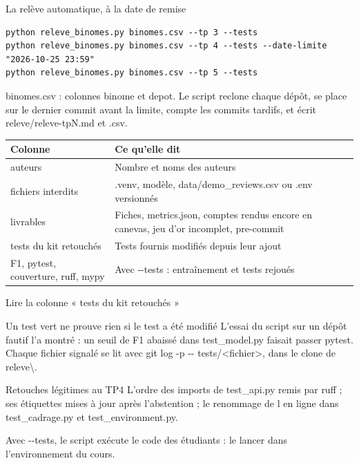 \documentclass[aspectratio=169,11pt]{beamer}
\newcommand{\co}[1]{{\ttfamily\hyphenchar\font=45\relax #1}}
\newcommand{\bs}{\textbackslash\allowbreak{}}
\begin{document}
\begin{frame}[fragile]{La relève automatique, à la date de remise}
\begin{lstlisting}
python releve_binomes.py binomes.csv --tp 3 --tests
python releve_binomes.py binomes.csv --tp 4 --tests --date-limite "2026-10-25 23:59"
python releve_binomes.py binomes.csv --tp 5 --tests
\end{lstlisting}
\small \co{binomes.csv} : colonnes \co{binome} et \co{depot}. Le script reclone chaque dépôt, se place sur le
dernier commit avant la limite, compte les commits tardifs, et écrit \co{releve/releve-tpN.md} et \co{.csv}.

\scriptsize
\begin{tabularx}{\textwidth}{@{}l X@{}}
\toprule
\textbf{Colonne} & \textbf{Ce qu'elle dit} \\
\midrule
\co{auteurs} & Nombre et noms des auteurs \\
\co{fichiers interdits} & \co{.venv}, modèle, \co{data/demo\_reviews.csv} ou \co{.env} versionnés \\
\co{livrables} & Fiches, \co{metrics.json}, comptes rendus encore en canevas, jeu d'or incomplet, pre-commit \\
\co{tests du kit retouchés} & Tests fournis modifiés depuis leur ajout \\
\co{F1}, \co{pytest}, \co{couverture}, \co{ruff}, \co{mypy} & Avec \co{-{}-tests} : entraînement et tests rejoués \\
\bottomrule
\end{tabularx}
\end{frame}

\begin{frame}{Lire la colonne « tests du kit retouchés »}
\begin{alertblock}{Un test vert ne prouve rien si le test a été modifié}
\small L'essai du script sur un dépôt fautif l'a montré : un seuil de F1 abaissé dans \co{test\_model.py}
faisait passer pytest. Chaque fichier signalé se lit avec \co{git log -p -{}- tests/<fichier>}, dans le clone
de \co{releve\bs}.
\end{alertblock}
\begin{exampleblock}{Retouches légitimes au TP4}
\small L'ordre des imports de \co{test\_api.py} remis par ruff ; ses étiquettes mises à jour après l'abstention ;
le renommage de \co{l} en \co{ligne} dans \co{test\_cadrage.py} et \co{test\_environment.py}.
\end{exampleblock}
\small Avec \co{-{}-tests}, le script exécute le code des étudiants : le lancer dans l'environnement du cours.
\end{frame}
\end{document}
